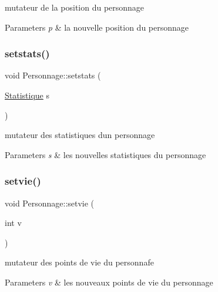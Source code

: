 mutateur de la position du personnage 


\begin{DoxyParams}{Parameters}
{\em p} & la nouvelle position du personnage \\
\hline
\end{DoxyParams}
\mbox{\label{class_personnage_adb15b654ddd26ba1c6944d62b607a163}} 
\subsubsection{\texorpdfstring{setstats()}{setstats()}}
{\footnotesize\ttfamily void Personnage\+::setstats (\begin{DoxyParamCaption}\item[{\hyperlink{class_statistique}{Statistique}}]{s }\end{DoxyParamCaption})}



mutateur des statistiques d\textquotesingle{}un personnage 


\begin{DoxyParams}{Parameters}
{\em s} & les nouvelles statistiques du personnage \\
\hline
\end{DoxyParams}
\mbox{\label{class_personnage_abf011d14740f841ac11580ed4af305d0}} 
\subsubsection{\texorpdfstring{setvie()}{setvie()}}
{\footnotesize\ttfamily void Personnage\+::setvie (\begin{DoxyParamCaption}\item[{int}]{v }\end{DoxyParamCaption})}



mutateur des points de vie du personnafe 


\begin{DoxyParams}{Parameters}
{\em v} & les nouveaux points de vie du personnage \\
\hline
\end{DoxyParams}
\mbox{\label{class_personnage_acc01f2696e2fd76f72e62aec460b9c58}} 
